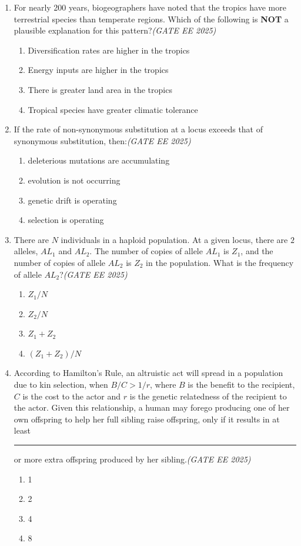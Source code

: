 \begin{enumerate}[leftmargin=*,label=\textbf{Q.\arabic*},resume]

\item For nearly 200 years, biogeographers have noted that the tropics have more terrestrial species than temperate regions. Which of the following is \textbf{NOT} a plausible explanation for this pattern?\hfill \textit{(GATE EE 2025)}
\begin{enumerate}[label=(\Alph*)]
\item Diversification rates are higher in the tropics
\item Energy inputs are higher in the tropics
\item There is greater land area in the tropics
\item Tropical species have greater climatic tolerance
\end{enumerate}

\item If the rate of non-synonymous substitution at a locus exceeds that of synonymous substitution, then:\hfill \textit{(GATE EE 2025)}
\begin{enumerate}[label=(\Alph*)]
\item deleterious mutations are accumulating
\item evolution is not occurring
\item genetic drift is operating
\item selection is operating
\end{enumerate}

\item There are $N$ individuals in a haploid population. At a given locus, there are $2$ alleles, $AL_1$ and $AL_2$. The number of copies of allele $AL_1$ is $Z_1$, and the number of copies of allele $AL_2$ is $Z_2$ in the population. What is the frequency of allele $AL_2$?\hfill \textit{(GATE EE 2025)}
\begin{enumerate}[label=(\Alph*)]
\item $Z_1/N$
\item $Z_2/N$
\item $Z_1 + Z_2$
\item $(Z_1 + Z_2)/N$
\end{enumerate}

\item According to Hamilton's Rule, an altruistic act will spread in a population due to kin selection, when $B/C > 1/r$, where $B$ is the benefit to the recipient, $C$ is the cost to the actor and $r$ is the genetic relatedness of the recipient to the actor. Given this relationship, a human may forego producing one of her own offspring to help her full sibling raise offspring, only if it results in at least \rule{2cm}{0.15mm} or more extra offspring produced by her sibling.\hfill \textit{(GATE EE 2025)}
\begin{enumerate}[label=(\Alph*)]
\item 1
\item 2
\item 4
\item 8
\end{enumerate}


\end{enumerate}
